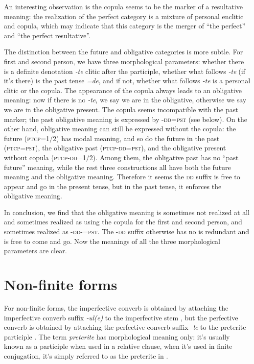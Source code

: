 \documentclass[a4paper, oneside, 12pt]{report}
\newcommand*{\citepage}[1]{p.~{#1}}
\newcommand*{\term}[1]{\emph{#1}}
\newcommand{\form}[1]{\emph{#1}}
\newcommand{\category}[1]{\textsc{#1}}
\begin{document}
An interesting observation is the copula seems to be the marker of a resultative meaning: 
the realization of the perfect category 
is a mixture of personal enclitic and copula, 
which may indicate that this category is the merger of ``the perfect'' and ``the perfect resultative''.

The distinction between the future and obligative categories is more subtle.
For first and second person, 
we have three morphological parameters:
whether there is a definite denotation \form{-te} clitic after the participle, 
whether what follows \form{-te} (if it's there) is 
the past tense \form{=de},
and if not, whether what follows \form{-te} is a personal clitic 
or the copula.
The appearance of the copula always leads to an obligative meaning:
now if there is no \form{-te}, 
we say we are in the obligative, 
otherwise we say we are in the obligative present. 
The copula seems incompatible with the past marker;
the past obligative meaning is expressed by -\category{dd}=\category{pst}
(see below).
On the other hand, obligative meaning can still be expressed 
without the copula:
the future (\category{ptcp}=\category{1/2}) has modal meaning, 
and so do the future in the past (\category{ptcp}=\category{pst}),
the obligative past (\category{ptcp}-\category{dd}=\category{pst}), 
and the obligative present without copula (\category{ptcp}-\category{dd}=\category{1/2}).
Among them, the obligative past has no ``past future'' meaning, 
while the rest three constructions all have both the future meaning 
and the obligative meaning.
Therefore it seems the \category{dd} suffix is free to appear and go 
in the present tense, 
but in the past tense, it enforces the obligative meaning.

In conclusion, we find that the obligative meaning is sometimes not realized at all 
and sometimes realized as using the copula for the first and second person,
and sometimes realized as \category{-dd}-\category{=pst}.
The \category{-dd} suffix otherwise has no is redundant and is free to come and go.
Now the meanings of all the three morphological parameters are clear.

\section{Non-finite forms}

For non-finite forms, the imperfective converb 
is obtained by attaching the imperfective converb suffix \form{-ul(e)} to the imperfective stem
\citep[\citepage{306}]{forker2020grammar},
but the perfective converb is obtained by 
attaching the perfective converb suffix \form{-le} to the preterite participle 
\citep[\citepage{308}]{forker2020grammar}.
The term \term{preterite} has morphological meaning only:
it's usually known as a participle when used in a relative clause, 
when it's used in finite conjugation, 
it's simply referred to as the preterite in \citet{forker2020grammar}.



\end{document}
